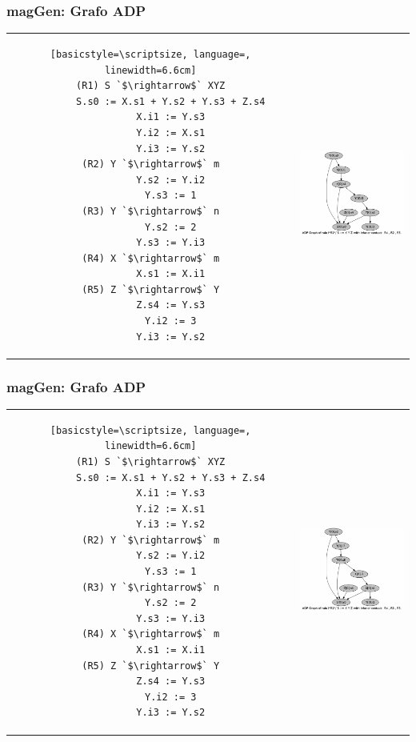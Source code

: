 \documentclass[10pt, xcolor=table, xcolor=dvipsnames]{beamer}
\newcommand{\maggen}{\textbf{magGen}}
\begin{document}
\begin{frame}[fragile]
    \frametitle{\maggen: Grafo ADP}

\begin{tabular}{c p{4.5cm}}
\hspace{-0.3cm}
\begin{lstlisting}[basicstyle=\scriptsize, language=, linewidth=6.6cm]
(R1) S `$\rightarrow$` XYZ
       S.s0 := X.s1 + Y.s2 + Y.s3 + Z.s4
       X.i1 := Y.s3
       Y.i2 := X.s1
       Y.i3 := Y.s2
(R2) Y `$\rightarrow$` m
       Y.s2 := Y.i2
       Y.s3 := 1
(R3) Y `$\rightarrow$` n
       Y.s2 := 2
       Y.s3 := Y.i3
(R4) X `$\rightarrow$` m
       X.s1 := X.i1
(R5) Z `$\rightarrow$` Y
       Z.s4 := Y.s3
       Y.i2 := 3
       Y.i3 := Y.s2
\end{lstlisting}
&\hspace{0.2cm}\parbox[c]{1em}{\includegraphics[width=149px, height=150px]{./15_adp_graph.png}}
\end{tabular}

\end{frame}

\begin{frame}[fragile]
    \frametitle{\maggen: Grafo ADP}
\begin{tabular}{c p{4.5cm}}
\hspace{-0.3cm}
\begin{lstlisting}[basicstyle=\scriptsize, language=, linewidth=6.6cm]
(R1) S `$\rightarrow$` XYZ
       S.s0 := X.s1 + Y.s2 + Y.s3 + Z.s4
       X.i1 := Y.s3
       Y.i2 := X.s1
       Y.i3 := Y.s2
(R2) Y `$\rightarrow$` m
       Y.s2 := Y.i2
       Y.s3 := 1
(R3) Y `$\rightarrow$` n
       Y.s2 := 2
       Y.s3 := Y.i3
(R4) X `$\rightarrow$` m
       X.s1 := X.i1
(R5) Z `$\rightarrow$` Y
       Z.s4 := Y.s3
       Y.i2 := 3
       Y.i3 := Y.s2
\end{lstlisting}
&\hspace{0.2cm}\parbox[c]{1em}{\includegraphics[width=149px, height=150px]{./16_adp_graph.png}}
\end{tabular}

\end{frame}
\end{document}

